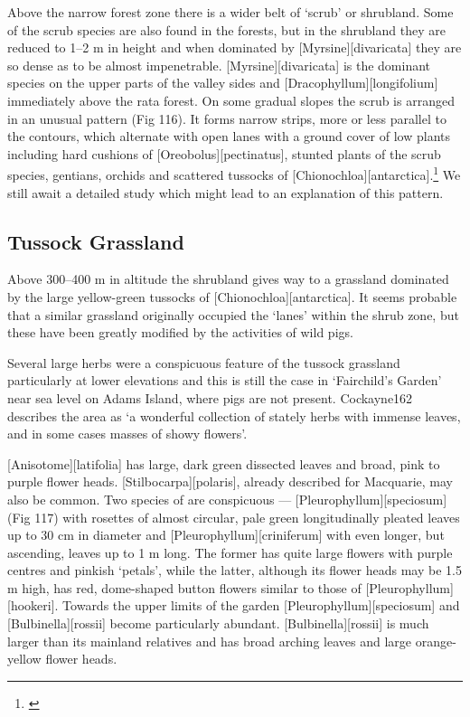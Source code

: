 Above the narrow forest zone there is a wider belt of `scrub' or shrubland.
Some of the scrub species are also found in the forests, but in the shrubland they are reduced to 1--2 m in height and when dominated by [Myrsine][divaricata] they are so dense as to be almost impenetrable. [Myrsine][divaricata] is the dominant species on the upper parts of the valley sides and [Dracophyllum][longifolium] immediately above the rata forest.
On some gradual slopes the scrub is arranged in an unusual pattern (Fig 116).
It forms narrow strips, more or less parallel to the contours, which alternate with open lanes with a ground cover of low plants including hard cushions of [Oreobolus][pectinatus], stunted plants of the scrub species, gentians, orchids and scattered tussocks of [Chionochloa][antarctica].\footnote{\cite{godley1965notes}}
We still await a detailed study which might lead to an explanation of this pattern.

\subsection{Tussock Grassland}

Above 300--400 m in altitude the shrubland gives way to a grassland dominated by the large yellow-green tussocks of [Chionochloa][antarctica].
It seems probable that a similar grassland originally occupied the `lanes' within the shrub zone, but these have been greatly modified by the activities of wild pigs.

Several large herbs were a conspicuous feature of the tussock grassland particularly at lower elevations and this is still the case in `Fairchild's Garden' near sea level on Adams Island, where pigs are not present.
Cockayne162 describes the area as `a wonderful collection of stately herbs with immense leaves, and in some cases masses of showy flowers'.

[Anisotome][latifolia] has large, dark green dissected leaves and broad, pink to purple flower heads. [Stilbocarpa][polaris], already described for Macquarie, may also be common.
Two species of  are conspicuous --- [Pleurophyllum][speciosum] (Fig 117) with rosettes of almost circular, pale green longitudinally pleated leaves up to 30 cm in diameter and [Pleurophyllum][criniferum] with even longer, but ascending, leaves up to 1 m long.
The former has quite large flowers with purple centres and pinkish `petals', while the latter, although its flower heads may be 1.5 m high, has red, dome-shaped button flowers similar to those of [Pleurophyllum][hookeri].
Towards the upper limits of the garden [Pleurophyllum][speciosum] and [Bulbinella][rossii] become particularly abundant. [Bulbinella][rossii] is much larger than its mainland relatives and has broad arching leaves and large orange-yellow flower heads.

